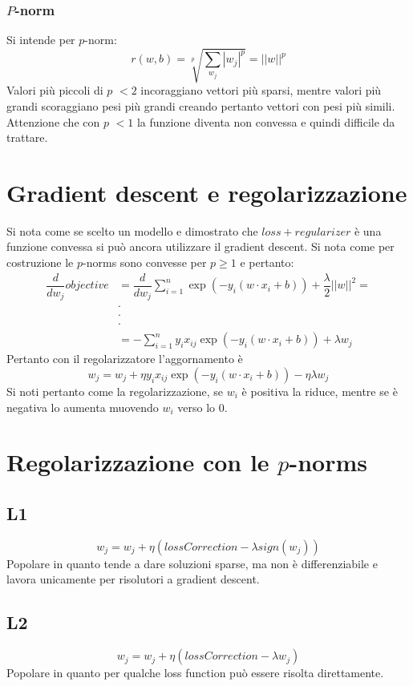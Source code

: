 		\subsubsection{$P$-norm}
		Si intende per $p$-norm:
		$$r(w,b)=\sqrt[p]{\sum\limits_{w_j}|w_j|^p}=||w||^p$$
		Valori pi\`u piccoli di $p$ $<2$ incoraggiano vettori pi\`u sparsi, mentre valori pi\`u grandi scoraggiano pesi pi\`u grandi creando pertanto vettori con pesi pi\`u simili. 
		Attenzione che con $p$ $<1$ la funzione diventa non convessa e quindi difficile da trattare.

\section{Gradient descent e regolarizzazione}
Si nota come se scelto un modello e dimostrato che $loss+regularizer$ \`e una funzione convessa si pu\`o ancora utilizzare il gradient descent.
Si nota come per costruzione le $p$-norms sono convesse per $p\ge 1$ e pertanto:
\begin{align*}
	\dfrac{d}{dw_j}objective&=\dfrac{d}{dw_j}\sum\limits_{i=1}^n\exp(-y_i(w\cdot x_i + b))+\dfrac{\lambda}{2}||w||^2=\\
	&\cdot\\
	&\cdot\\
	&\cdot\\
	&=-\sum\limits_{i=1}^ny_ix_{ij}\exp(-y_i(w\cdot x_i+b))+\lambda w_j
\end{align*}
Pertanto con il regolarizzatore l'aggornamento \`e
$$w_j=w_j+\eta y_ix_{ij}\exp(-y_i(w\cdot x_i+b))-\eta\lambda w_j$$
Si noti pertanto come la regolarizzazione, se $w_i$ \`e positiva la riduce, mentre se \`e negativa lo aumenta muovendo $w_i$ verso lo $0$.

\section{Regolarizzazione con le $p$-norms}

	\subsection{L1}
	$$w_j = w_j + \eta(lossCorrection - \lambda sign(w_j))$$
	Popolare in quanto tende a dare soluzioni sparse, ma non \`e differenziabile e lavora unicamente per risolutori a gradient descent.
	
	\subsection{L2}
	$$w_j = w_j + \eta(lossCorrection - \lambda w_j)$$
	Popolare in quanto per qualche loss function pu\`o essere risolta direttamente.
	

